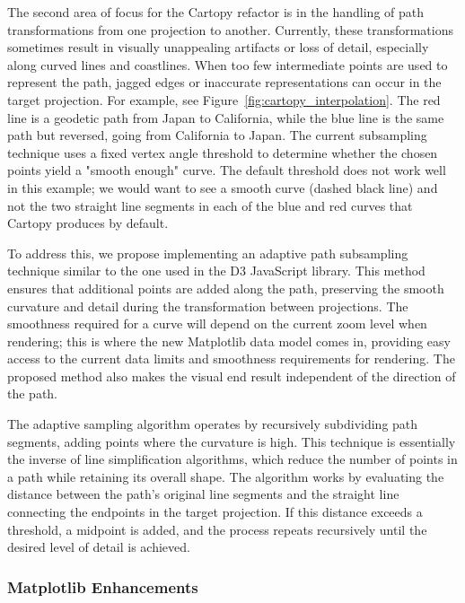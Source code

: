 \documentclass[12pt]{article}
\numberwithin{page}{section}
\begin{document}
The second area of focus for the Cartopy refactor is in the handling of path transformations from
one projection to another. Currently, these transformations sometimes result in
visually unappealing artifacts or loss of detail,
especially along curved lines and coastlines. When too few intermediate points
are used to represent the path, jagged edges or inaccurate
representations can occur in the target projection.
For example, see Figure~\ref{fig:cartopy_interpolation}.
The red line is a geodetic path from Japan to California, while the blue line
is the same path but reversed, going from California to Japan. The current subsampling technique
uses a fixed vertex angle threshold to determine whether the chosen points yield
a "smooth enough" curve. The default threshold does not work well in this
example; we would want to see a smooth curve (dashed black line) and not the
two straight line segments in each of the blue and red curves that Cartopy produces
by default.


To address this, we propose implementing an adaptive path subsampling technique similar to
the one used in the D3 JavaScript library. This method ensures that additional points are
added along the path, preserving the smooth curvature and detail during the
transformation between projections. The smoothness required for a curve will depend on the current
zoom level when rendering; this is where the new Matplotlib data model comes
in, providing easy
access to the current data limits and smoothness requirements for rendering.
The proposed method also makes the visual end result independent
of the direction of the path.


The adaptive sampling algorithm operates by recursively subdividing path segments,
adding points where the curvature is high.
This technique is essentially the inverse of line simplification algorithms,
which reduce the number of points in a path while retaining its overall shape.
The algorithm works by evaluating
the distance between the path's original line segments and the straight line
connecting the endpoints in the target projection. If this distance exceeds a
threshold, a midpoint is added, and the process repeats recursively until
the desired level of detail is achieved.


\subsubsection{Matplotlib Enhancements}
\end{document}
